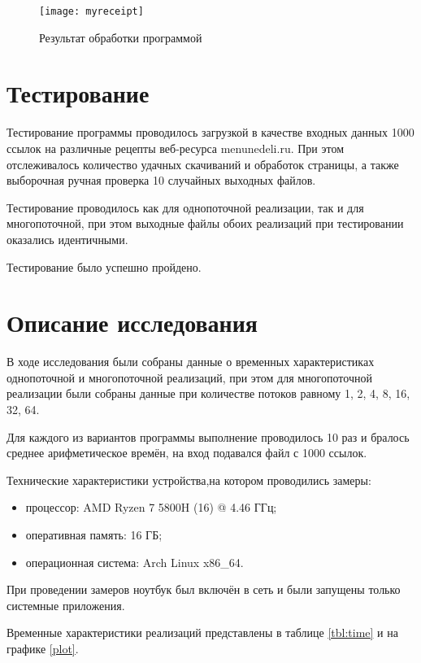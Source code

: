 \begin{figure}[h]
	\centering
	\texttt{[image: myreceipt]}
	\caption{Результат обработки программой}
	\label{after}
\end{figure}

\vspace{20mm}
{\let\clearpage\relax \chapter{Тестирование}}

Тестирование программы проводилось загрузкой в качестве входных данных 1000 ссылок на различные рецепты веб-ресурса menunedeli.ru. При этом отслеживалось количество удачных скачиваний и обработок страницы, а также выборочная ручная проверка 10 случайных выходных файлов. 

Тестирование проводилось как для однопоточной реализации, так и для многопоточной, при этом выходные файлы обоих реализаций при тестировании оказались идентичными.

Тестирование было успешно пройдено.

\vspace{20mm}
{\let\clearpage\relax \chapter{Описание исследования}}

В ходе исследования были собраны данные о временных характеристиках однопоточной и многопоточной реализаций, при этом для многопоточной реализации были собраны данные при количестве потоков равному 1, 2, 4, 8, 16, 32, 64.

Для каждого из вариантов программы выполнение проводилось 10 раз и бралось среднее арифметическое времён, на вход подавался файл с 1000 ссылок.

Технические характеристики устройства,на котором проводились замеры:

\begin{itemize}
	\item процессор: AMD Ryzen 7 5800H (16) @ 4.46 ГГц;
	\item оперативная память: 16 ГБ;
	\item операционная система: Arch Linux x86\_64.
\end{itemize}

При проведении замеров ноутбук был включён в сеть и были запущены только системные приложения.

Временные характеристики реализаций представлены в таблице \ref{tbl:time} и на графике \ref{plot}.

